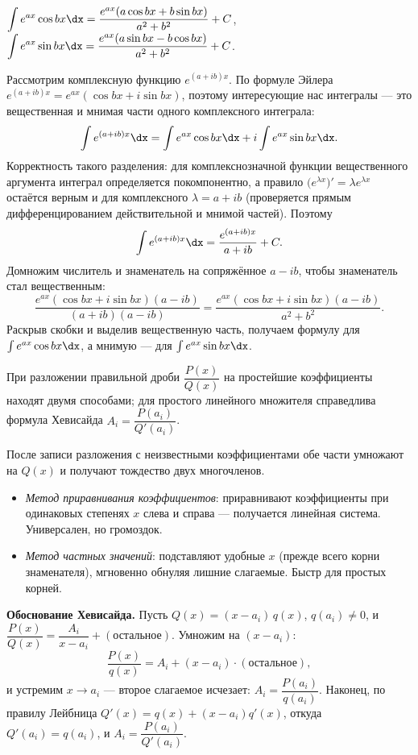 \stmt $\displaystyle\int e^{ax}\cos bx\dx=\frac{e^{ax}(a\cos bx+b\sin bx)}{a^2+b^2}+C$,\quad
$\displaystyle\int e^{ax}\sin bx\dx=\frac{e^{ax}(a\sin bx-b\cos bx)}{a^2+b^2}+C$.

\dok Рассмотрим комплексную функцию $e^{(a+ib)x}$. По формуле Эйлера
$e^{(a+ib)x}=e^{ax}(\cos bx+i\sin bx)$, поэтому интересующие нас интегралы — это вещественная и
мнимая части одного комплексного интеграла:
\[
  \int e^{(a+ib)x}\dx=\int e^{ax}\cos bx\dx+i\int e^{ax}\sin bx\dx .
\]
Корректность такого разделения: для комплекснозначной функции вещественного аргумента интеграл
определяется покомпонентно, а правило $\bigl(e^{\lambda x}\bigr)'=\lambda e^{\lambda x}$ остаётся
верным и для комплексного $\lambda=a+ib$ (проверяется прямым дифференцированием действительной и
мнимой частей). Поэтому
\[
  \int e^{(a+ib)x}\dx=\frac{e^{(a+ib)x}}{a+ib}+C .
\]
Домножим числитель и знаменатель на сопряжённое $a-ib$, чтобы знаменатель стал вещественным:
\[
  \frac{e^{ax}(\cos bx+i\sin bx)(a-ib)}{(a+ib)(a-ib)}
  =\frac{e^{ax}(\cos bx+i\sin bx)(a-ib)}{a^2+b^2}.
\]
Раскрыв скобки и выделив вещественную часть, получаем формулу для $\int e^{ax}\cos bx\dx$, а мнимую
— для $\int e^{ax}\sin bx\dx$.

\stmt При разложении правильной дроби $\dfrac{P(x)}{Q(x)}$ на простейшие коэффициенты находят
двумя способами; для простого линейного множителя справедлива формула Хевисайда
$A_i=\dfrac{P(a_i)}{Q'(a_i)}$.

\dok После записи разложения с неизвестными коэффициентами обе части умножают на $Q(x)$ и
получают тождество двух многочленов.
\begin{itemize}[leftmargin=*,nosep]
  \item \emph{Метод приравнивания коэффициентов}: приравнивают коэффициенты при одинаковых
        степенях $x$ слева и справа — получается линейная система. Универсален, но громоздок.
  \item \emph{Метод частных значений}: подставляют удобные $x$ (прежде всего корни знаменателя),
        мгновенно обнуляя лишние слагаемые. Быстр для простых корней.
\end{itemize}
\textbf{Обоснование Хевисайда.} Пусть $Q(x)=(x-a_i)\,q(x)$, $q(a_i)\ne0$, и
$\dfrac{P(x)}{Q(x)}=\dfrac{A_i}{x-a_i}+(\text{остальное})$. Умножим на $(x-a_i)$:
\[
  \frac{P(x)}{q(x)}=A_i+(x-a_i)\cdot(\text{остальное}),
\]
и устремим $x\to a_i$ — второе слагаемое исчезает: $A_i=\dfrac{P(a_i)}{q(a_i)}$. Наконец, по
правилу Лейбница $Q'(x)=q(x)+(x-a_i)q'(x)$, откуда $Q'(a_i)=q(a_i)$, и
$A_i=\dfrac{P(a_i)}{Q'(a_i)}$.

